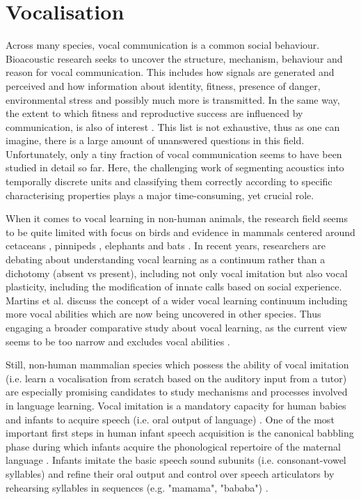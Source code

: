 \section{Vocalisation}\label{sec:vocalisation}
Across many species, vocal communication is a common social behaviour.
Bioacoustic research seeks to uncover the structure, mechanism, behaviour and reason for vocal communication. This includes how signals are generated and perceived and how information about identity, fitness, presence of danger, environmental stress and possibly much more is transmitted. In the same way, the extent to which fitness and reproductive success are influenced by communication, is also of interest \cite{Kershenbaum2016, Manteuffel2004}.
This list is not exhaustive, thus as one can imagine, there is a large amount of unanswered questions in this field.
Unfortunately, only a tiny fraction of vocal communication seems to have been studied in detail so far. Here, the challenging work of segmenting acoustics into temporally discrete units and classifying them correctly according to specific characterising properties plays a major time-consuming, yet crucial role.

When it comes to vocal learning in non-human animals, the research field seems to be quite limited with focus on birds \cite{Petkov2012} and evidence in mammals centered around cetaceans \cite{Janik2014}, pinnipeds \cite{Reichmuth2014}, elephants \cite{Poole2005} and bats \cite{Knornschild2014}.
In recent years, researchers are debating about understanding vocal learning as a continuum rather than a dichotomy (absent vs present), including not only vocal imitation but also vocal plasticity, including the modification of innate calls based on social experience.
Martins et al. discuss the concept of a wider vocal learning continuum including more vocal abilities which are now being uncovered in other species.
Thus engaging a broader comparative study about vocal learning, as the current view seems to be too narrow and excludes vocal abilities \cite{Martins2020VocalContinuum}.

Still, non-human mammalian species which possess the ability of vocal imitation (i.e. learn a vocalisation from scratch based on the auditory input from a tutor) are especially promising candidates to study mechanisms and processes involved in language learning. Vocal imitation is a mandatory capacity for human babies and infants to acquire speech (i.e. oral output of language) \cite{Vihman2014}. One of the most important first steps in human infant speech acquisition is the canonical babbling phase during which infants acquire the phonological repertoire of the maternal language \cite{OLLER1980THEINFANCY,Vihman2014}. Infants imitate the basic speech sound subunits (i.e. consonant-vowel syllables) and refine their oral output and control over speech articulators by rehearsing syllables in sequences (e.g. "mamama", "bababa") \cite{Kuhl1996}.

